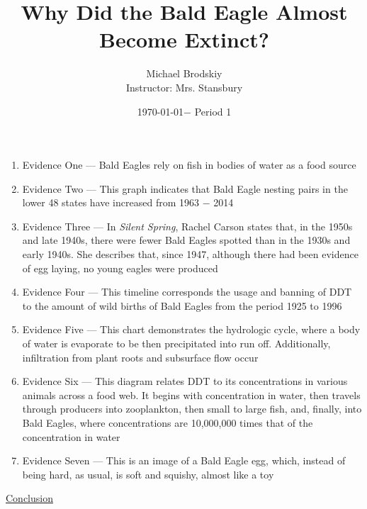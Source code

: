 \documentclass[12pt]{article}
\title{Why Did the Bald Eagle Almost Become Extinct?}
\date{\today $-$ Period 1}
\author{Michael Brodskiy\\ \small Instructor: Mrs. Stansbury}
\begin{document}
\maketitle

\begin{enumerate}

  \item Evidence One — Bald Eagles rely on fish in bodies of water as a food source

  \item Evidence Two — This graph indicates that Bald Eagle nesting pairs in the lower 48 states have increased from 1963 $-$ 2014

  \item Evidence Three — In \textit{Silent Spring}, Rachel Carson states that, in the 1950s and late 1940s, there were fewer Bald Eagles spotted than in the 1930s and early 1940s. She describes that, since 1947, although there had been evidence of egg laying, no young eagles were produced

  \item Evidence Four — This timeline corresponds the usage and banning of DDT to the amount of wild births of Bald Eagles from the period 1925 to 1996

  \item Evidence Five — This chart demonstrates the hydrologic cycle, where a body of water is evaporate to be then precipitated into run off. Additionally, infiltration from plant roots and subsurface flow occur

  \item Evidence Six — This diagram relates DDT to its concentrations in various animals across a food web. It begins with concentration in water, then travels through producers into zooplankton, then small to large fish, and, finally, into Bald Eagles, where concentrations are 10,000,000 times that of the concentration in water

  \item Evidence Seven — This is an image of a Bald Eagle egg, which, instead of being hard, as usual, is soft and squishy, almost like a toy

\end{enumerate}

\newpage

\begin{center}
  \underline{Conclusion}
\end{center}
\end{document}
